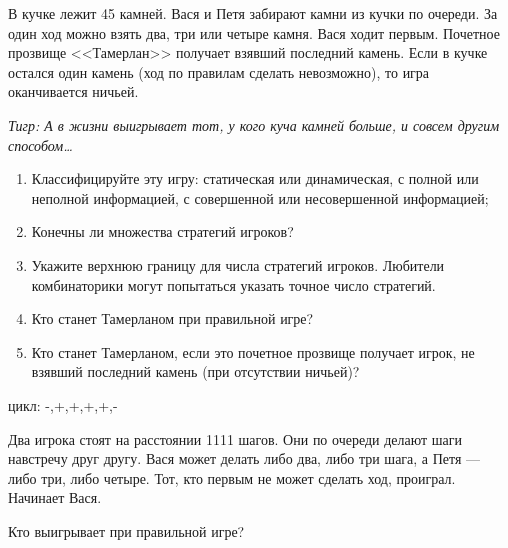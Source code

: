 \begin{problem}[Тамерлан]\par
В кучке лежит 45 камней. Вася и Петя забирают камни из кучки по очереди. За один ход можно взять два, три или четыре камня. Вася ходит первым. Почетное прозвище <<Тамерлан>> получает взявший последний камень. Если в кучке остался один камень (ход по правилам сделать невозможно), то игра оканчивается ничьей.\par
{\it Тигр: А в жизни выигрывает тот, у кого куча камней больше, и совсем другим способом\ldots }\par
\begin{enumerate}
\item	 Классифицируйте эту игру: статическая или динамическая, с полной или неполной информацией, с совершенной или несовершенной информацией;\par
\item	Конечны ли множества стратегий игроков?\par
\item	Укажите верхнюю границу для числа стратегий игроков. Любители комбинаторики могут попытаться указать точное число стратегий.\par
\item	Кто станет Тамерланом при правильной игре?\par
\item	Кто станет Тамерланом, если это почетное прозвище получает игрок, не взявший последний камень (при отсутствии ничьей)?
\end{enumerate}

\begin{sol}
 цикл: -,+,+,+,+,-
\end{sol}
\end{problem}

\begin{problem}
Два игрока стоят на расстоянии 1111 шагов. Они по очереди делают шаги навстречу друг другу. Вася может делать либо два, либо три шага, а Петя --- либо три, либо четыре. Тот, кто первым не может сделать ход, проиграл. Начинает Вася.\par
Кто выигрывает при правильной игре?\par

\begin{sol}

\end{sol}
\end{problem}




